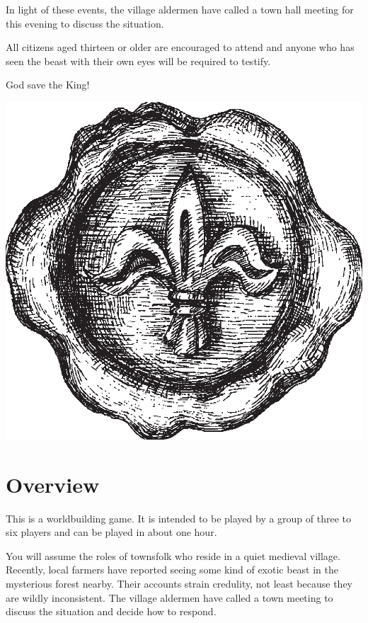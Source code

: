 \documentclass[a6paper, 11pt, parskip=half, DIV=15]{scrartcl}
\begin{document}
\bigskip

In light of these events, the village aldermen have called a town hall meeting for this evening to discuss the situation.

\bigskip

All citizens aged thirteen or older are encouraged to attend and anyone who has seen the beast with their own eyes will be required to testify.

\bigskip

God save the King!

\vspace{-1.6cm}
\hspace{5cm} \includegraphics[scale=1.0]{Images/wax_seal.png}

\setmainfont[Scale=1.05]{EBGaramond}
\normalsize

\newpage
\enlargethispage{1.75\baselineskip}

\section*{Overview}
This is a worldbuilding game. It is intended to be played by a group of three to six players and can be played in about one hour.

You will assume the roles of townsfolk who reside in a quiet medieval village. Recently, local farmers have reported seeing some kind of exotic beast in the mysterious forest nearby. Their accounts strain credulity, not least because they are wildly inconsistent. The village aldermen have called a town meeting to discuss the situation and decide how to respond.
\end{document}
